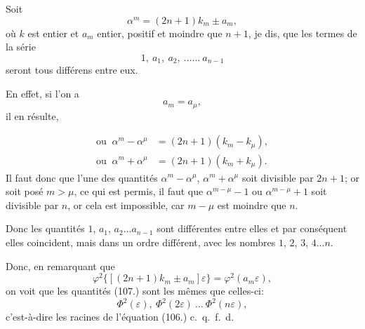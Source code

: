 \documentclass{article}
\begin{document}
Soit
\[ \alpha^{m}=(2n+1)k_{m}\pm a_{m}, \]
où $k$ est entier et $a_{m}$ entier, positif et moindre que $n+1$, je dis, que les termes de la série
\[ 1,\ a_{1},\ a_{2},\ \ldots\ldots\ a_{n-1} \]
seront tous différens entre eux.

En effet, si l'on a
\[ a_{m}=a_{\mu}, \]
il en résulte,

\[ \begin{aligned}
\text{ou }\ \alpha^{m}-\alpha^{\mu}&=(2n+1)(k_{m}-k_{\mu}),\\
\text{ou }\ \alpha^{m}+\alpha^{\mu}&=(2n+1)(k_{m}+k_{\mu}).
\end{aligned} \]
Il faut donc que l'une des quantités $\alpha^{m}-\alpha^{\mu}$, $\alpha^{m}+\alpha^{\mu}$ soit divisible par $2n+1$; or soit posé $m>\mu$, ce qui est permis, il faut que $\alpha^{m-\mu}-1$ ou $\alpha^{m-\mu}+1$ soit divisible par $n$, or cela est impossible, car $m-\mu$ est moindre que $n$.

Donc les quantités $1$, $a_{1}$, $a_{2}\ldots a_{n-1}$ sont différentes entre elles et par conséquent elles coincident, mais dans un ordre différent, avec les nombres $1$, $2$, $3$, $4\ldots n$.

Donc, en remarquant que
\[ \varphi^{2}\{[(2n+1)k_{m}\pm a_{m}]\varepsilon\}=\varphi^{2}(a_{m}\varepsilon), \]
on voit que les quantités (107.) sont les mêmes que celles-ci:
\[ \Phi^{2}(\varepsilon),\ \Phi^{2}(2\varepsilon)\ \ldots\ \Phi^{2}(n\varepsilon), \]
c'est-à-dire les racines de l'équation (106.) c.\ q.\ f.\ d.
\end{document}

